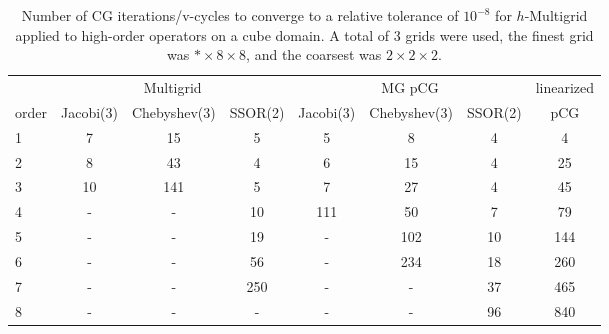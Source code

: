


\begin{table}
  \caption{\label{tab:box3} Number of CG iterations/v-cycles to converge to a relative tolerance of $10^{-8}$ for $h$-Multigrid applied to high-order operators on a cube domain. A total of 3 grids were used, the finest grid was $*\times 8\times 8$, and the coarsest was $2\times 2\times 2$.}
		\centering
    \begin{tabular}{|l|c|c|c|c|c|c|c|} 
	    \hline
				    & \multicolumn{3}{c|}{Multigrid} & \multicolumn{3}{c|}{MG pCG} & linearized \\  \cline{2-7}
			order & \scriptsize Jacobi(3)  &\scriptsize  Chebyshev(3)  &\scriptsize SSOR(2) &\scriptsize Jacobi(3)  &\scriptsize  Chebyshev(3)  &\scriptsize SSOR(2) & pCG \\
			\hline
        1 & 7 & 15 & 5 & 5 & 8 & 4    & 4    \\
	    	2 & 8 & 43 & 4 & 6 & 15 & 4   & 25   \\
        3 & 10 & 141 & 5 & 7 & 27 & 4 & 45   \\
        4 & - & - & 10 & 111 & 50 & 7 & 79   \\
				5 & - & - & 19 & - & 102 & 10 & 144  \\
        6 & - & - & 56 & - & 234 & 18 & 260  \\
			  7 & - & - & 250 & - & - & 37  & 465  \\	
				8 & - & - & -   & - & - & 96  & 840  \\
			\hline
	  \end{tabular}
\end{table}


